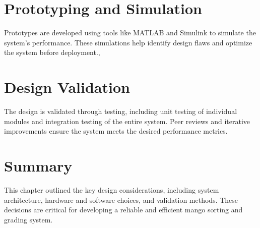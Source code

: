 \section{Prototyping and Simulation}
Prototypes are developed using tools like MATLAB and Simulink to simulate the system’s performance. These simulations help identify design flaws and optimize the system before deployment.,

\section{Design Validation}
The design is validated through testing, including unit testing of individual modules and integration testing of the entire system. Peer reviews and iterative improvements ensure the system meets the desired performance metrics.

\section{Summary}
This chapter outlined the key design considerations, including system architecture, hardware and software choices, and validation methods. These decisions are critical for developing a reliable and efficient mango sorting and grading system.

